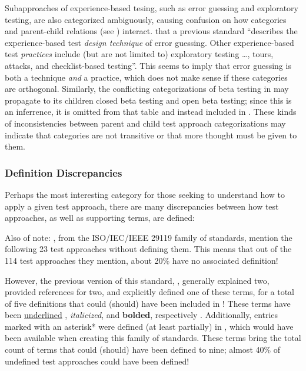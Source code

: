 Subapproaches of experience-based tesing, such as error guessing and
exploratory testing, are also categorized ambiguously, causing confusion on how
categories and parent-child relations (see ) interact.
 \citet[p.~34\ifnotpaper, emphasis added\fi]{IEEE2022}
 that a previous standard \citeyearpar{IEEE2021}
``describes the experience-based test \emph{design technique} of error
guessing. Other experience-based test \emph{practices} include (but are not
limited to) exploratory testing \dots, tours, attacks, and checklist-based
testing''. This seems to imply that error guessing is both a technique
\emph{and} a practice, which does not make sense if these categories are
orthogonal. \ifnotpaper Similarly, the conflicting categorizations of beta
    testing in  may propagate to its children closed beta
    testing and open beta testing; since this is an inferrence, it is omitted
    from that table and instead included in . \fi These
kinds of inconsistencies between parent and child test approach categorizations
may indicate that categories are not transitive or that more thought must be
given to them.

\ifnotpaper
    \begin{bigLandscape}
        
    \end{bigLandscape}
\else %
\fi

\subsubsection{Definition Discrepancies}
\label{defs}

Perhaps the most interesting category for those seeking to understand how to
apply a given test approach, there are many discrepancies between how test
approaches, as well as supporting terms, are defined:



\ifnotpaper
    Also of note: \citep{IEEE2022, IEEE2021}, from the
    ISO/IEC/IEEE 29119 family of standards, mention the following 23 test
    approaches without defining them. This means that out of the 114 test
    approaches they mention, about 20\% have no associated definition!

    However, the previous version of this standard, \citeyearpar{IEEE2013},
    generally explained two, provided references for two, and explicitly defined
    one of these terms, for a total of five definitions that could (should) have
    been included in \citeyearpar{IEEE2022}! These terms have been
    \underline{underlined}\ifnotpaper%
        , \emph{italicized}, and \textbf{bolded}, respectively%
    \fi. Additionally, entries marked with an asterisk* were defined (at least
    partially) in \citeyearpar{IEEE2017}, which would have been available when
    creating this family of standards. These terms bring the total count of terms
    that could (should) have been defined to nine; almost 40\% of undefined test
    approaches could have been defined!

